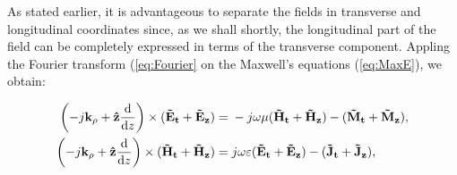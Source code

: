 \documentclass[11pt]{article}
\renewcommand{\v}[1]{\mathbf{#1}} %
\newcommand{\ti}[1]{\tilde{#1}} %
\renewcommand{\O}{\omega}  %
\newcommand{\E}{\varepsilon}  %
\renewcommand{\u}{\mu}  %
\newcommand{\p}{\rho}  %
\newcommand{\x}{\times}  %
\renewcommand{\^}{\hat}  %
\begin{document}
  As stated earlier, it is advantageous to separate the fields in transverse and longitudinal coordinates since, as we shall shortly, the longitudinal part of the field can be completely expressed in terms of the transverse component. Appling the Fourier transform (\ref{eq:Fourier} on the Maxwell's equations (\ref{eq:MaxE}), we obtain:

  \begin{subequations}
    \begin{align}
      \left(-j\v{k_{\p}} + \v{\^{z}} \dv{}{z} \right)\x (\v{\ti{E}_t} + \v{\ti{E}_z})  ={}& -j \O \u (\v{\ti{H}_t} + \v{\ti{H}_z}) -
      (\v{\ti{M}_t} + \v{\ti{M}_z}),
      \label{eq:FT_E}\\
      \left(-j\v{k_{\p}} + \v{\^{z}} \dv{}{z} \right)\x (\v{\ti{H}_t} + \v{\ti{H}_z})  ={}& j \O \E (\v{\ti{E}_t} + \v{\ti{E}_z}) -
      (\v{\ti{J}_t} + \v{\ti{J}_z}),
      \label{eq:FT_H}
    \end{align}
    \label{eq:FT_MaxE}
  \end{subequations}
\end{document}
